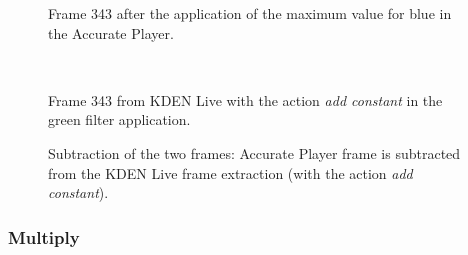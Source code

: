 \documentclass[../MasterThesis.tex]{subfiles}
\begin{document}
\begin{minipage}{0.48\textwidth}
	\begin{figure}[H]
		\begin{center}
			\caption[Frame 343 after the application of the blue filter in the Accurate Player.]{Frame 343 after the application of the maximum value for blue in the Accurate Player.}
		\end{center}
	\end{figure}
\end{minipage}\begin{minipage}{0.04\textwidth}
	\ 
\end{minipage}\begin{minipage}{0.48\textwidth}
	\begin{figure}[H]
		\begin{center}
			\caption[Frame 343 from KDEN Live with the action \textit{add constant}.]{Frame 343 from KDEN Live with the action \textit{add constant} in the green filter application.}
		\end{center}
	\end{figure}
\end{minipage}

\vspace*{-1em}



\begin{figure}[H]
	\begin{center}
		\caption[Subtraction of KDEN Live (\textit{add constant}) and Accurate Player.]{Subtraction of the two frames: Accurate Player frame is subtracted from the KDEN Live frame extraction (with the action \textit{add constant}).}
	\end{center}
\end{figure}

















\subsubsection*{Multiply}
\end{document}
